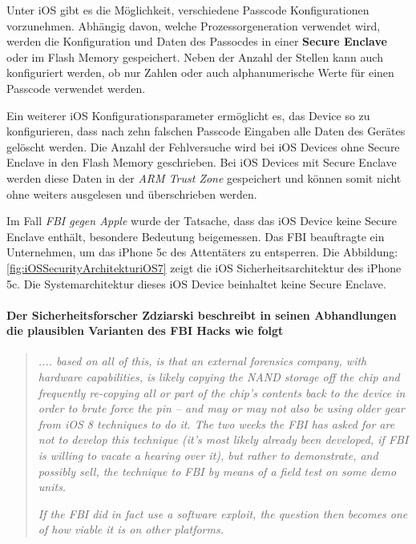  Unter iOS gibt es die Möglichkeit, verschiedene Passcode Konfigurationen vorzunehmen. Abhängig davon, welche Prozessorgeneration verwendet wird, werden die Konfiguration und Daten des Passocdes in einer \textbf{Secure Enclave} oder im Flash Memory gespeichert. Neben der Anzahl der Stellen kann auch konfiguriert werden, ob nur Zahlen oder auch alphanumerische Werte für einen Passcode verwendet werden.\par 
 Ein weiterer iOS Konfigurationsparameter ermöglicht es, das Device so zu konfigurieren, dass nach zehn falschen Passcode Eingaben alle Daten des Gerätes gelöscht werden. Die Anzahl der Fehlversuche wird bei iOS Devices ohne Secure Enclave in den Flash Memory geschrieben. Bei iOS Devices mit Secure Enclave werden diese Daten in der \textit{\glqq ARM Trust Zone\grqq{}} gespeichert und können somit nicht ohne weiters ausgelesen und überschrieben werden. 
 
 
 Im Fall \textit{\glqq FBI gegen Apple\grqq{}} wurde der Tatsache, dass das iOS Device keine Secure Enclave enthält, besondere Bedeutung beigemessen. Das FBI beauftragte ein Unternehmen, um das iPhone 5c des Attentäters zu entsperren. Die Abbildung: \ref{fig:iOSSecurityArchitekturiOS7} zeigt die iOS Sicherheitsarchitektur des iPhone 5c. Die Systemarchitektur dieses iOS Device beinhaltet keine Secure Enclave. \par 
\paragraph{Der Sicherheitsforscher Zdziarski beschreibt in seinen Abhandlungen die plausiblen Varianten des FBI Hacks wie folgt}
\begin{quote}
    \textit{\glqq .... based on all of this, is that an external forensics company, with hardware capabilities, is likely copying the NAND storage off the chip and frequently re-copying all or part of the chip’s contents back to the device in order to brute force the pin – and may or may not also be using older gear from iOS 8 techniques to do it. The two weeks the FBI has asked for are not to develop this technique (it’s most likely already been developed, if FBI is willing to vacate a hearing over it), but rather to demonstrate, and possibly sell, the technique to FBI by means of a field test on some demo units.\grqq{}} \cite{Hacking[4]} \par 
    \textit{\glqq If the FBI did in fact use a software exploit, the question then becomes one of how viable it is on other platforms.\grqq{}} \cite{Hacking[4]}
\end{quote}
